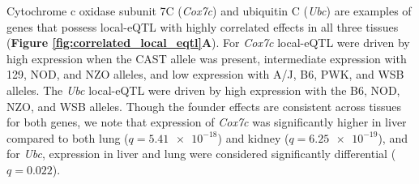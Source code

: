 \documentclass[9pt,twocolumn,twoside]{gsajnl}
\begin{document}

Cytochrome c oxidase subunit 7C (\textit{Cox7c}) and ubiquitin C (\textit{Ubc}) are examples of genes that possess local-eQTL with highly correlated effects in all three tissues (\textbf{Figure \ref{fig:correlated_local_eqtl}A}).
For \textit{Cox7c} local-eQTL were driven by high expression when the CAST allele was present, intermediate expression with 129, NOD, and NZO alleles, and low expression with A/J, B6, PWK, and WSB alleles. The \textit{Ubc} local-eQTL were driven by high expression with the B6, NOD, NZO, and WSB alleles. Though the founder effects are consistent across tissues for both genes, we note that expression of \textit{Cox7c} was significantly higher in liver compared to both lung ($q = \num{5.41e-18}$) and kidney ($q = \num{6.25e-19}$), and for \textit{Ubc}, expression in liver and lung were considered significantly differential ($q = 0.022$). 


\end{document}
